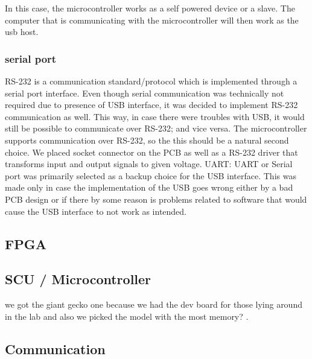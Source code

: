 In this case, the microcontroller works as a self powered device or a slave. The computer that is communicating with the microcontroller
will then work as the usb host.


\subsubsection{serial port} 

RS-232 is a communication standard/protocol which is implemented through a serial port interface.
Even though serial communication was technically not required due to presence of USB interface, it was decided to implement RS-232 communication as well.
This way, in case there were troubles with USB, it would still be possible to communicate over RS-232; and vice versa.
The microcontroller supports communication over RS-232, so the this should be a natural second choice.
We placed socket connector on the PCB as well as a RS-232 driver that transforms input and output signals to given voltage.
UART: UART or Serial port was primarily selected as a backup choice for the USB interface. This was made only in case the implementation
of the USB goes wrong either by a bad PCB design or if there by some reason is problems related to software that would cause the USB interface to not work as intended.


\subsection{FPGA} \label{pcb:design-choices:ss:fpga}


\subsection{SCU / Microcontroller} \label{pcb:design-choices:ss:scu}
we got the giant gecko one because we had the dev board for those lying around in the lab and also we picked the model with the most memory? .


\subsection{Communication} \label{pcb:design-choices:ss:internal_communication}

